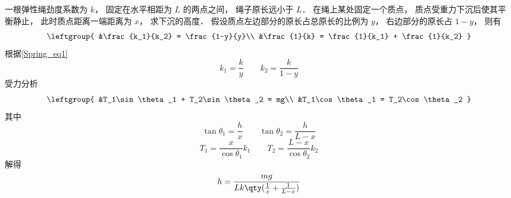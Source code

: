 \begin{example}{}
一根弹性绳劲度系数为 $k$， 固定在水平相距为 $L$ 的两点之间， 绳子原长远小于 $L$． 在绳上某处固定一个质点， 质点受重力下沉后使其平衡静止， 此时质点距离一端距离为 $x$， 求下沉的高度．
假设质点左边部分的原长占总原长的比例为 $y$， 右边部分的原长占 $1-y$， 则有
\begin{equation}
\leftgroup{
&\frac{k_1}{k_2} = \frac{1-y}{y}\\
&\frac{1}{k} = \frac{1}{k_1} + \frac{1}{k_2}
}
\end{equation}
根据\autoref{Spring_eq1}
\begin{equation}
k_1 = \frac{k}{y} \qquad
k_2 = \frac{k}{1-y}
\end{equation}
受力分析
\begin{equation}
\leftgroup{
&T_1\sin\theta_1 + T_2\sin\theta_2 = mg\\
&T_1\cos\theta_1 = T_2\cos\theta_2
}
\end{equation}
其中
\begin{equation}
\tan\theta_1 = \frac{h}{x}
\qquad
\tan\theta_2 = \frac{h}{L-x}
\end{equation}
\begin{equation}
T_1 = \frac{x}{\cos\theta_1} k_1 \qquad
T_2 = \frac{L-x}{\cos\theta_2} k_2
\end{equation}
解得
\begin{equation}
h = \frac{mg}{Lk\qty(\frac{1}{x} + \frac{1}{L-x})}
\end{equation}
\end{example}
